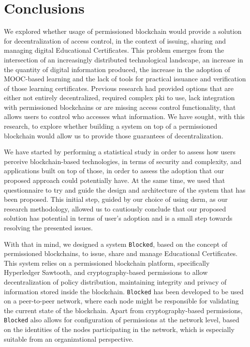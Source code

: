 \chapter{Conclusions}
\label{chap:conclusion}

We explored whether usage of permissioned blockchain would provide a solution for decentralization of access control, in the context of issuing, sharing and managing digital Educational Certificates. This problem emerges from the intersection of an increasingly distributed technological landscape, an increase in the quantity of digital information produced, the increase in the adoption of MOOC-based learning and the lack of tools for practical issuance and verification of those learning certificates. Previous research had provided options that are either not entirely decentralized, required complex \gls{pki} to use, lack integration with permissioned blockchains or are missing access control functionality, that allows users to control who accesses what information. We have sought, with this research, to explore whether building a system on top of a permissioned blockchain would allow us to provide those guarantees of decentralization.

We have started by performing a statistical study in order to assess how users perceive blockchain-based technologies, in terms of security and complexity, and applications built on top of those, in order to assess the adoption that our proposed approach could potentially have. At the same time, we used that questionnaire to try and guide the design and architecture of the system that has been proposed. This initial step, guided by our choice of using \gls{dsrm}, as our research methodology, allowed us to cautiously conclude that our proposed solution has potential in terms of user's adoption and is a small step towards resolving the presented issues.

With that in mind, we designed a system \texttt{Blocked}, based on the concept of permissioned blockchains, to issue, share and manage Educational Certificates. This system relies on a permissioned blockchain platform, specifically Hyperledger Sawtooth, and cryptography-based permissions to allow decentralization of policy distribution, maintaining integrity and privacy of information stored inside the blockchain. \texttt{Blocked} has been developed to be used on a peer-to-peer network, where each node might be responsible for validating the current state of the blockchain. Apart from cryptography-based permissions, \texttt{Blocked} also allows for configuration of permissions at the network level, based on the identities of the nodes participating in the network, which is especially suitable from an organizational perspective.

